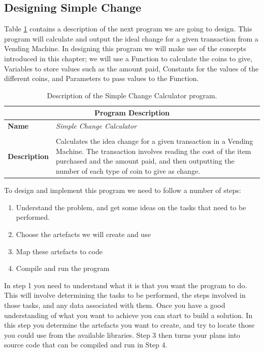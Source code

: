 \subsection{Designing Simple Change} %
\label{sub:designing_simple_change}

Table \ref{tbl:storing-data-prog} contains a description of the next program we are going to design. This program will calculate and output the ideal change for a given transaction from a Vending Machine. In designing this program we will make use of the concepts introduced in this chapter; we will use a Function to calculate the coins to give, Variables to store values such as the amount paid, Constants for the values of the different coins, and Parameters to pass values to the Function.

\begin{table}[h]
\centering
\begin{tabular}{l|p{10cm}}
  \hline
  \multicolumn{2}{c}{\textbf{Program Description}} \\
  \hline
  \textbf{Name} & \emph{Simple Change Calculator} \\
  \\
  \textbf{Description} & Calculates the idea change for a given transaction in a Vending Machine. The transaction involves reading the cost of the item purchased and the amount paid, and then outputting the number of each type of coin to give as change.\\
  \hline
\end{tabular}
\caption{Description of the Simple Change Calculator program.}
\label{tbl:storing-data-prog}
\end{table}


To design and implement this program we need to follow a number of steps:
\begin{enumerate}
  \item Understand the problem, and get some ideas on the tasks that need to be performed.
  \item Choose the artefacts we will create and use
  \item Map these artefacts to code
  \item Compile and run the program
\end{enumerate}

In step 1 you need to understand what it is that you want the program to do. This will involve determining the tasks to be performed, the steps involved in those tasks, and any data associated with them. Once you have a good understanding of what you want to achieve you can start to build a solution. In this step you determine the artefacts you want to create, and try to locate those you could use from the available libraries. Step 3 then turns your plans into source code that can be compiled and run in Step 4. 

